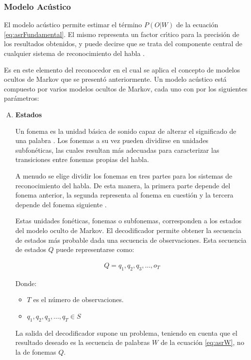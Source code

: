 \subsubsection{Modelo Ac\'ustico}
El modelo ac\'ustico permite estimar el t\'ermino $P(O|W)$ de la ecuaci\'on \ref{eq:asrFundamental}.
El mismo representa un factor cr{\'\i}tico para la precisi\'on de los resultados obtenidos, y puede decirse que
se trata del componente central de cualquier sistema de reconocimiento del habla \cite{huang-handbook10}.

Es en este elemento del reconocedor en el cual se aplica el concepto de modelos ocultos de Markov que se present\'o
anteriormente. Un modelo ac\'ustico est\'a compuesto por varios modelos ocultos de Markov, cada uno con
por los siguientes par\'ametros:


\begin{enumerate}[A)]
	\item \textbf{Estados}


	Un fonema es la unidad b\'asica de sonido capaz de alterar el significado de una palabra \cite{Armbruster2003}.
	Los fonemas a su vez pueden dividirse en unidades subfon\'eticas, las cuales resultan m\'as adecuadas para
	caracterizar las transiciones entre fonemas propias del habla.

	A menudo se elige dividir los fonemas en tres partes para los sistemas de reconocimiento del habla.
	De esta manera, la primera parte depende del fonema anterior, la segunda representa al fonema en cuesti\'on
	y la tercera depende del fonema siguiente \cite{CMUConcepts}.

	Estas unidades fon\'eticas, fonemas o subfonemas, corresponden a los estados del modelo oculto de Markov.
	El decodificador permite obtener la secuencia de estados m\'as probable dada una secuencia de observaciones.
	Esta secuencia de estados $Q$ puede representarse como:

	\begin{align}
		Q = q_1,q_2,q_3,\ldots,o_T\label{eq:hmmQ}
	\end{align}

	Donde:
	\begin{itemize}
		\item $T$ es el n\'umero de observaciones.
		\item $q_1,q_2,q_3,\ldots,q_T \in S$
	\end{itemize}

	La salida del decodificador supone un problema, teniendo en cuenta que el resultado deseado es la secuencia 
	de palabras $W$ de la ecuaci\'on \ref{eq:asrW}, no la de fonemas $Q$.


\end{enumerate}
